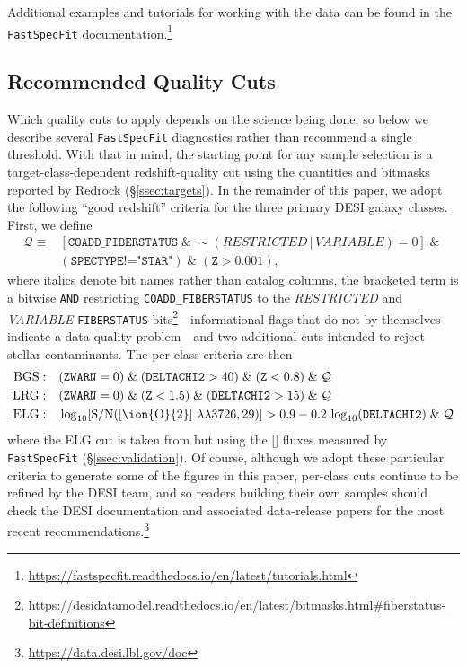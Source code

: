 \documentclass[modern,linenumbers]{aastex702}
\newcommand{\fastspecfit}{\texttt{FastSpecFit}}
\newcommand{\oii}{[\ion{O}{2}]}
\newcommand{\oiidoublet}{[\ion{O}{2}]~$\lambda\lambda3726,29$}
\begin{document}
\noindent Additional examples and tutorials for working with the data
can be found in the \fastspecfit{}
documentation.\footnote{\url{https://fastspecfit.readthedocs.io/en/latest/tutorials.html}}

\subsection{Recommended Quality Cuts}
\label{ssec:cuts}

Which quality cuts to apply depends on the science being done, so
below we describe several \fastspecfit{} diagnostics rather than
recommend a single threshold. With that in mind, the starting point
for any sample selection is a target-class-dependent redshift-quality
cut using the quantities and bitmasks reported by Redrock
(\S\ref{ssec:targets}). In the remainder of this paper, we adopt the
following ``good redshift'' criteria for the three primary DESI galaxy
classes. First, we define
\begin{equation}
  \begin{split}
    \mathcal{Q} \equiv {} & [\mathtt{COADD\_FIBERSTATUS} \;\&\;
    \sim (\mathit{RESTRICTED} \,|\, \mathit{VARIABLE}) = 0] \;\&\; \\
    & (\mathtt{SPECTYPE} \texttt{!=} \texttt{"STAR"}) \;\&\; (\mathtt{Z} > 0.001),
  \end{split}
  \label{eq:goodz_common}
\end{equation}
\noindent where italics denote bit names rather than catalog columns,
the bracketed term is a bitwise \texttt{AND} restricting
\texttt{COADD\_FIBERSTATUS} to the \textit{RESTRICTED} and
\textit{VARIABLE} \texttt{FIBERSTATUS}
bits\footnote{\url{https://desidatamodel.readthedocs.io/en/latest/bitmasks.html\#fiberstatus-bit-definitions}}---informational
flags that do not by themselves indicate a data-quality problem---and
two additional cuts intended to reject stellar contaminants. The
per-class criteria are then
\begin{align}
  \mathrm{BGS:}\quad & (\mathtt{ZWARN}=0) \;\&\; (\mathtt{DELTACHI2} > 40) \;\&\;
  (\mathtt{Z} < 0.8) \;\&\; \mathcal{Q} \label{eq:goodz_bgs}\\
  \mathrm{LRG:}\quad & (\mathtt{ZWARN}=0) \;\&\; (\mathtt{Z} < 1.5) \;\&\;
  (\mathtt{DELTACHI2} > 15) \;\&\; \mathcal{Q} \label{eq:goodz_lrg}\\
  \mathrm{ELG:}\quad &
  \log_{10}\!\left[\mathrm{S/N}(\text{\oiidoublet})\right] > 0.9 -
  0.2\,\log_{10}(\mathtt{DELTACHI2}) \;\&\; \mathcal{Q}
  \label{eq:goodz_elg}
\end{align}
\noindent where the ELG cut is taken from \citet{raichoor23a} but
using the \oii{} fluxes measured by \fastspecfit{}
(\S\ref{ssec:validation}). Of course, although we adopt these
particular criteria to generate some of the figures in this paper,
per-class cuts continue to be refined by the DESI team, and so readers
building their own samples should check the DESI documentation and
associated data-release papers for the most recent
recommendations.\footnote{\url{https://data.desi.lbl.gov/doc}}
\end{document}
